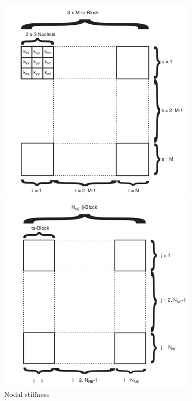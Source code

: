 \documentclass[a4paper,12pt]{article}
\begin{document}
\begin{figure}[!htbp]
  \centering
  \begin{minipage}[b]{0.35\textwidth}
    \includegraphics[width=\textwidth]{3.png}
    \caption{Nodal stiffness}
    \label{Nodal}
  \end{minipage}
  \hfill
  \begin{minipage}[b]{0.35\textwidth}
    \includegraphics[width=\textwidth]{4.png}

\end{minipage}
\end{figure}
\end{document}

